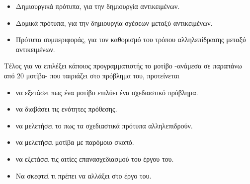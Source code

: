 \begin{itemize}
    \item Δημιουργικά πρότυπα, για την δημιουργία αντικειμένων.
    \item Δομικά πρότυπα, για την δημιουργία σχέσεων μεταξύ αντικειμένων.
    \item Πρότυπα συμπεριφοράς, για τον καθορισμό του τρόπου αλληλεπίδρασης μεταξύ αντικειμένων.
\end{itemize}
Τέλος για να επιλέξει κάποιος προγραμματιστής το μοτίβο -ανάμεσα σε παραπάνω από 20 μοτίβα- που ταιριάζει στο πρόβλημα του, προτείνεται 
\begin{itemize}
    \item να εξετάσει πως ένα μοτίβο επιλύει ένα σχεδιαστικό πρόβλημα.
    \item να διαβάσει τις ενότητες πρόθεσης.
    \item να μελετήσει το πως τα σχεδιαστικά πρότυπα αλληλεπιδρούν.
    \item να μελετήσει μοτίβα με παρόμοιο σκοπό.
    \item να εξετάσει τις αιτίες επανασχεδιασμού του έργου του.
    \item Να σκεφτεί τι πρέπει να αλλάξει στο έργο του.
\end{itemize}
